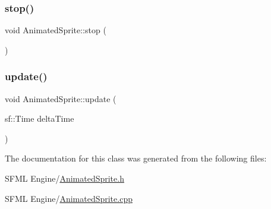 \mbox{\label{class_animated_sprite_af9734f4346d3d2370322b2dcaeef133c}} 
\subsubsection{\texorpdfstring{stop()}{stop()}}
{\footnotesize\ttfamily void Animated\+Sprite\+::stop (\begin{DoxyParamCaption}{ }\end{DoxyParamCaption})}

\mbox{\label{class_animated_sprite_a17a41ff812631a9d8947d272933d6696}} 
\subsubsection{\texorpdfstring{update()}{update()}}
{\footnotesize\ttfamily void Animated\+Sprite\+::update (\begin{DoxyParamCaption}\item[{sf\+::\+Time}]{delta\+Time }\end{DoxyParamCaption})}



The documentation for this class was generated from the following files\+:\begin{DoxyCompactItemize}
\item 
S\+F\+M\+L Engine/\hyperlink{_animated_sprite_8h}{Animated\+Sprite.\+h}\item 
S\+F\+M\+L Engine/\hyperlink{_animated_sprite_8cpp}{Animated\+Sprite.\+cpp}\end{DoxyCompactItemize}
